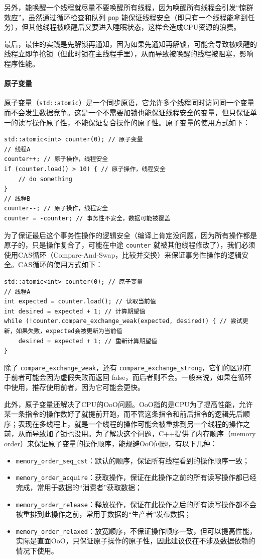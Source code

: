 另外，能唤醒一个线程就尽量不要唤醒所有线程，因为唤醒所有线程会引发“惊群效应”，虽然通过循环检查和队列 \verb|pop| 能保证线程安全（即只有一个线程能拿到任务），但其他线程被唤醒后又要进入睡眠状态，这样会造成CPU资源的浪费。

最后，最佳的实践是先解锁再通知，因为如果先通知再解锁，可能会导致被唤醒的线程立即争抢锁（但此时锁在主线程手里），从而导致被唤醒的线程被阻塞，影响程序性能。

\paragraph{原子变量} 原子变量（\verb|std::atomic|）是一个同步原语，它允许多个线程同时访问同一个变量而不会发生数据竞争。这是一个不需要加锁也能保证线程安全的变量，但只保证单一的读写操作原子性，不能保证复合操作的原子性。原子变量的使用方式如下：
\begin{verbatim}
std::atomic<int> counter(0); // 原子变量
// 线程A
counter++; // 原子操作，线程安全
if (counter.load() > 10) { // 原子操作，线程安全
    // do something
}
// 线程B
counter--; // 原子操作，线程安全
counter = -counter; // 事务性不安全，数据可能被覆盖
\end{verbatim}
为了保证最后这个事务性操作的逻辑安全（编译上肯定没问题，因为所有操作都是原子的，只是操作复合了，可能在中途 \verb|counter| 就被其他线程修改了），我们必须使用CAS循环（Compare-And-Swap，比较并交换）来保证事务性操作的逻辑安全。CAS循环的使用方式如下：
\begin{verbatim}
std::atomic<int> counter(0); // 原子变量
// 线程A
int expected = counter.load(); // 读取当前值
int desired = expected + 1; // 计算期望值
while (!counter.compare_exchange_weak(expected, desired)) { // 尝试更新，如果失败，expected会被更新为当前值
    desired = expected + 1; // 重新计算期望值
}
\end{verbatim}
除了 \verb|compare_exchange_weak|，还有 \verb|compare_exchange_strong|，它们的区别在于前者可能会因为虚假失败而返回 false，而后者则不会。一般来说，如果在循环中使用，推荐使用前者，因为它可能会更快。

此外，原子变量还解决了CPU的OoO问题。OoO指的是CPU为了提高性能，允许某一条指令的操作数好了就提前开跑，而不管这条指令和前后指令的逻辑先后顺序；表现在多线程上，就是一个线程的操作可能会被重排到另一个线程的操作之前，从而导致加了锁也没用。为了解决这个问题，C++提供了内存顺序（memory order）来保证原子变量的操作顺序，能规避OoO问题，有以下几种：
\begin{itemize}
    \item \verb|memory_order_seq_cst|：默认的顺序，保证所有线程看到的操作顺序一致；
    \item \verb|memory_order_acquire|：获取操作，保证在此操作之前的所有读写操作都已经完成，常用于数据的“消费者”获取数据；
    \item \verb|memory_order_release|：释放操作，保证在此操作之后的所有读写操作都不会被重排到此操作之前，常用于数据的“生产者”发布数据；
    \item \verb|memory_order_relaxed|：放宽顺序，不保证操作顺序一致，但可以提高性能，实际是直面OoO，只保证原子操作的原子性，因此建议仅在不涉及数据依赖的情况下使用。
\end{itemize}

